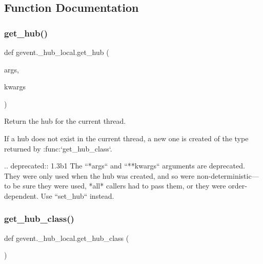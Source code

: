 \subsection{Function Documentation}
\mbox{\label{namespacegevent_1_1__hub__local_a59904c4b0aa4fc2b50908b46d5be8c7d}} 
\subsubsection{\texorpdfstring{get\+\_\+hub()}{get\_hub()}}
{\footnotesize\ttfamily def gevent.\+\_\+hub\+\_\+local.\+get\+\_\+hub (\begin{DoxyParamCaption}\item[{}]{args,  }\item[{}]{kwargs }\end{DoxyParamCaption})}

\begin{DoxyVerb}Return the hub for the current thread.

If a hub does not exist in the current thread, a new one is
created of the type returned by :func:`get_hub_class`.

.. deprecated:: 1.3b1
   The ``*args`` and ``**kwargs`` arguments are deprecated. They were
   only used when the hub was created, and so were non-deterministic---to be
   sure they were used, *all* callers had to pass them, or they were order-dependent.
   Use ``set_hub`` instead.
\end{DoxyVerb}
 \mbox{\label{namespacegevent_1_1__hub__local_acacad317cf51bfe0ff35af66c0a8f250}} 
\subsubsection{\texorpdfstring{get\+\_\+hub\+\_\+class()}{get\_hub\_class()}}
{\footnotesize\ttfamily def gevent.\+\_\+hub\+\_\+local.\+get\+\_\+hub\+\_\+class (\begin{DoxyParamCaption}{ }\end{DoxyParamCaption})}


